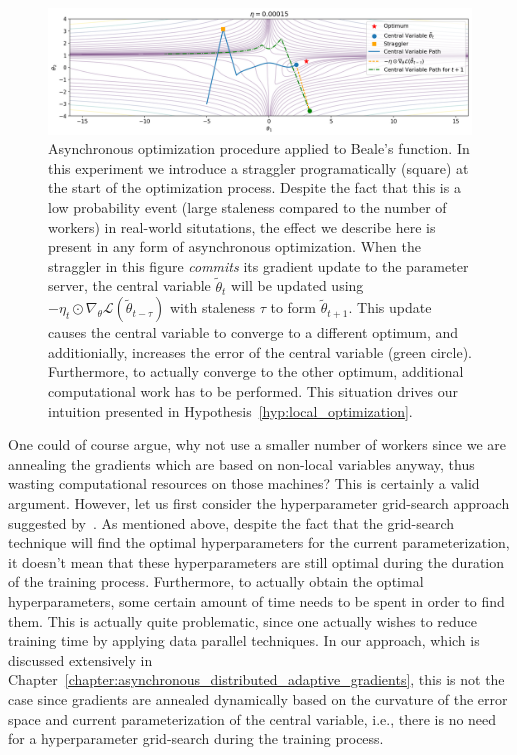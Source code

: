 \begin{figure}[H]
  \centering
  \includegraphics[width=\textwidth]{resources/images/async_straggler}
  \caption{Asynchronous optimization procedure applied to Beale's function. In this experiment we introduce a straggler programatically (square) at the start of the optimization process. Despite the fact that this is a low probability event (large staleness compared to the number of workers) in real-world situtations, the effect we describe here is present in any form of asynchronous optimization. When the straggler in this figure \emph{commits} its gradient update to the parameter server, the central variable $\tilde{\theta}_t$ will be updated using $-\eta_t \odot \nabla_\theta \mathcal{L}(\tilde{\theta}_{t - \tau})$ with staleness $\tau$ to form $\tilde{\theta}_{t+1}$. This update causes the central variable to converge to a different optimum, and additionially, increases the error of the central variable (green circle). Furthermore, to actually converge to the other optimum, additional computational work has to be performed. This situation drives our intuition presented in Hypothesis~\ref{hyp:local_optimization}.}
  \label{fig:async_momentum}
\end{figure}

One could of course argue, why not use a smaller number of workers since we are annealing the gradients which are based on non-local variables anyway, thus wasting computational resources on those machines? This is certainly a valid argument. However, let us first consider the hyperparameter grid-search approach suggested by~\cite{implicitmomentum}. As mentioned above, despite the fact that the grid-search technique will find the optimal hyperparameters for the current parameterization, it doesn't mean that these hyperparameters are still optimal during the duration of the training process. Furthermore, to actually obtain the optimal hyperparameters, some certain amount of time needs to be spent in order to find them. This is actually quite problematic, since one actually wishes to reduce training time by applying data parallel techniques. In our approach, which is discussed extensively in Chapter~\ref{chapter:asynchronous_distributed_adaptive_gradients}, this is not the case since gradients are annealed dynamically based on the curvature of the error space and current parameterization of the central variable, i.e., there is no need for a hyperparameter grid-search during the training process.


